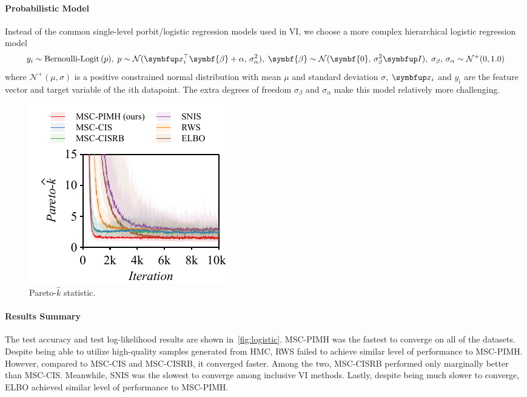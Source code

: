 \paragraph{Probabilistic Model}
Instead of the common single-level porbit/logistic regression models used in VI, we choose a more complex hierarchical logistic regression model \\
\begin{equation}
y_i \sim \text{Bernoulli-Logit}\,(p),\;
p \sim \mathcal{N}(\vx_i^{\top}\symbf{\beta} + \alpha,\, \sigma_{\alpha}^2),\;
\symbf{\beta} \sim \mathcal{N}(\symbf{0},\, \sigma_{\beta}^2 \mI),\;
\sigma_{\beta},\,\sigma_{\alpha} \sim \mathcal{N}^{+}(0, 1.0)
\end{equation}
where \(\mathcal{N}^+(\mu, \sigma)\) is a positive constrained normal distribution with mean \(\mu\) and standard deviation \(\sigma\), \(\vx_i\) and \(y_i\) are the feature vector and target variable of the \(i\)th datapoint.
The extra degrees of freedom \(\sigma_{\beta}\) and \(\sigma_{\alpha}\) make this model relatively more challenging.

%
\begin{figure}
  \vspace{-0.3in}
  \includegraphics[scale=0.8]{figures/german_01.pdf}
  \caption{Pareto-\(\widehat{k}\) statistic.}\label{fig:paretok}
  \vspace{-0.1in}
\end{figure}
%
\vspace{-0.1in}
\paragraph{Results Summary}
The test accuracy and test log-likelihood results are shown in~\cref{fig:logistic}.
MSC-PIMH was the fastest to converge on all of the datasets.
Despite being able to utilize high-quality samples generated from HMC, RWS failed to achieve similar level of performance to MSC-PIMH.
However, compared to MSC-CIS and MSC-CISRB, it converged faster.
Among the two, MSC-CISRB performed only marginally better than MSC-CIS.
Meanwhile, SNIS was the slowest to converge among inclusive VI methods.
Lastly, despite being much slower to converge, ELBO achieved similar level of performance to MSC-PIMH.

